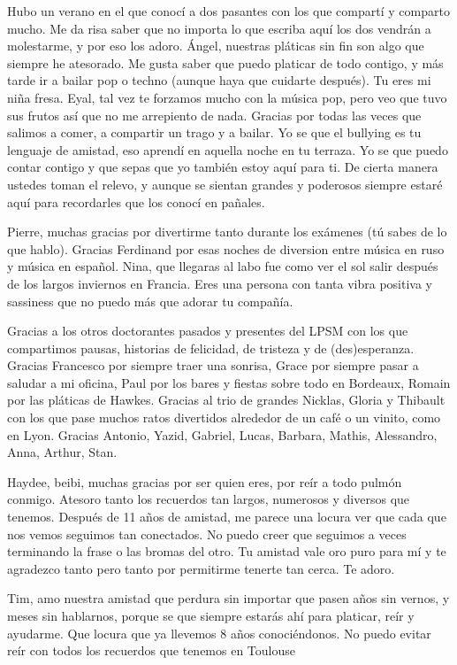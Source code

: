 Hubo un verano en el que conocí a dos pasantes con los que compartí y comparto mucho. Me da risa saber que no importa lo que escriba aquí los dos vendrán a molestarme, y por eso los adoro. Ángel, nuestras pláticas sin fin son algo que siempre he atesorado. Me gusta saber que puedo platicar de todo contigo, y más tarde ir a bailar pop o techno (aunque haya que cuidarte después). Tu eres mi niña fresa. Eyal, tal vez te forzamos mucho con la música pop, pero veo que tuvo sus frutos así que no me arrepiento de nada. Gracias por todas las veces que salimos a comer, a compartir un trago y a bailar. Yo se que el bullying es tu lenguaje de amistad, eso aprendí en aquella noche en tu terraza. Yo se que puedo contar contigo y que sepas que yo también estoy aquí para ti.
De cierta manera ustedes toman el relevo, y aunque se sientan grandes y poderosos siempre estaré aquí para recordarles que los conocí en pañales.

Pierre, muchas gracias por divertirme tanto durante los exámenes (tú sabes de lo que hablo). Gracias Ferdinand por esas noches de diversion entre música en ruso y música en español. Nina, que llegaras al labo fue como ver el sol salir después de los largos inviernos en Francia. Eres una persona con tanta vibra positiva y sassiness que no puedo más que adorar tu compañía.

Gracias a los otros doctorantes pasados y presentes del LPSM con los que compartimos pausas, historias de felicidad, de tristeza y de (des)esperanza. Gracias Francesco por siempre traer una sonrisa, Grace por siempre pasar a saludar a mi oficina, Paul por los bares y fiestas sobre todo en Bordeaux, Romain por las pláticas de Hawkes. Gracias al trio de grandes Nicklas, Gloria y Thibault con los que pase muchos ratos divertidos alrededor de un café o un vinito, como en Lyon. Gracias Antonio, Yazid, Gabriel, Lucas, Barbara, Mathis, Alessandro, Anna, Arthur, Stan.

Haydee, beibi, muchas gracias por ser quien eres, por reír a todo pulmón conmigo. Atesoro tanto los recuerdos tan largos, numerosos y diversos que tenemos. Después de 11 años de amistad, me parece una locura ver que cada que nos vemos seguimos tan conectados. No puedo creer que seguimos a veces terminando la frase o las bromas del otro. Tu amistad vale oro puro para mí y te agradezco tanto pero tanto por permitirme tenerte tan cerca. Te adoro.

Tim, amo nuestra amistad que perdura sin importar que pasen años sin vernos, y meses sin hablarnos, porque se que siempre estarás ahí para platicar, reír y ayudarme. Que locura que ya llevemos 8 años conociéndonos. No puedo evitar reír con todos los recuerdos que tenemos en Toulouse 

